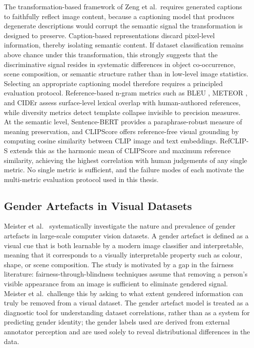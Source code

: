 The transformation-based framework of Zeng et al.\ requires generated captions to
faithfully reflect image content, because a captioning model that produces degenerate descriptions would corrupt the semantic
signal the transformation is designed to preserve. Caption-based representations discard pixel-level information, thereby isolating semantic
content. If dataset classification remains above chance under this transformation, this strongly suggests that the discriminative signal resides in systematic differences in
object co-occurrence, scene composition, or semantic structure rather than in low-level
image statistics. Selecting an appropriate captioning model therefore requires a
principled evaluation protocol. Reference-based n-gram metrics such as BLEU
\cite{Papineni_2002_BLEU}, METEOR \cite{Banerjee_2005_METEOR}, and CIDEr
\cite{Vedantam_2015_CIDEr} assess surface-level lexical overlap with human-authored
references, while diversity metrics \cite{Li_2016_DiversityNMT} detect template collapse
invisible to precision measures. At the semantic level, Sentence-BERT
\cite{Reimers_2019_SBERT} provides a paraphrase-robust measure of meaning preservation,
and CLIPScore \cite{Hessel_2021_CLIPScore} offers reference-free visual grounding by
computing cosine similarity between CLIP image and text embeddings. RefCLIP-S extends this
as the harmonic mean of CLIPScore and maximum reference similarity, achieving the highest
correlation with human judgements of any single metric. No single metric is sufficient, and the failure modes of each motivate the multi-metric
evaluation protocol used in this thesis.

\subsection*{Gender Artefacts in Visual Datasets}
\label{subsec:meister2023}

Meister et al.~\cite{Meister_2023_GenderArtifactsinVisualDatasets} systematically
investigate the nature and prevalence of gender artefacts in large-scale computer vision
datasets. A gender artefact is defined as a visual cue that is both learnable by a modern
image classifier and interpretable, meaning that it corresponds to a visually interpretable property such as colour, shape, or scene composition. The study is motivated by a gap in the fairness literature: fairness-through-blindness techniques assume that removing a person's visible
appearance from an image is sufficient to eliminate gendered signal. Meister et al.\
challenge this by asking to what extent gendered information can truly be removed from a
visual dataset. The gender artefact model is treated as a diagnostic tool for understanding dataset
correlations, rather than as a system for predicting gender identity; the gender labels used
are derived from external annotator perception and are used solely to reveal distributional
differences in the data.

